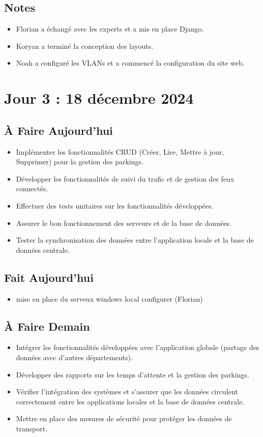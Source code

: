 \documentclass[a4paper,12pt]{report}
\begin{document}
\subsection{Notes}
\begin{itemize}
    \item Florian a échangé avec les experts et a mis en place Django.
    \item Koryan a terminé la conception des layouts.
    \item Noah a configuré les VLANs et a commencé la configuration du site web.
\end{itemize}

\section{Jour 3 : 18 décembre 2024}

\subsection{À Faire Aujourd'hui}
\begin{itemize}
    \item Implémenter les fonctionnalités CRUD (Créer, Lire, Mettre à jour, Supprimer) pour la gestion des parkings.
    \item Développer les fonctionnalités de suivi du trafic et de gestion des feux connectés.
    \item Effectuer des tests unitaires sur les fonctionnalités développées.
    \item Assurer le bon fonctionnement des serveurs et de la base de données.
    \item Tester la synchronisation des données entre l'application locale et la base de données centrale.
\end{itemize}

\subsection{Fait Aujourd'hui}
\begin{itemize}
    \item mise en place du serveux windows local configurer (Florian)
\end{itemize}

\subsection{À Faire Demain}
\begin{itemize}
    \item Intégrer les fonctionnalités développées avec l'application globale (partage des données avec d'autres départements).
    \item Développer des rapports sur les temps d'attente et la gestion des parkings.
    \item Vérifier l'intégration des systèmes et s'assurer que les données circulent correctement entre les applications locales et la base de données centrale.
    \item Mettre en place des mesures de sécurité pour protéger les données de transport.
\end{itemize}
\end{document}
